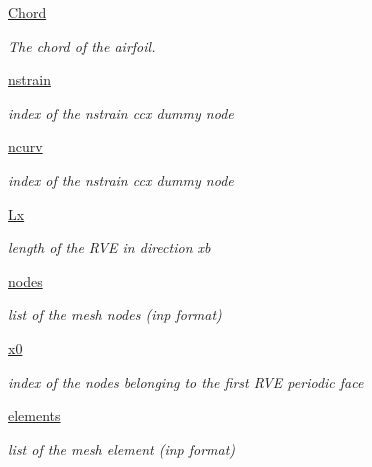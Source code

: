 \begin{DoxyCompactItemize}
\hyperlink{classgebtaero_1_1_external_mesh_1_1_external_mesh_ac9f8fc4f8dd8e81757bc8a5b2b5323d4}{Chord}
\begin{DoxyCompactList}\small\item\em The chord of the airfoil. \end{DoxyCompactList}\item 
\hyperlink{classgebtaero_1_1_external_mesh_1_1_external_mesh_ac8524a9940fbf969271113875fd4da1a}{nstrain}
\begin{DoxyCompactList}\small\item\em index of the nstrain ccx dummy node \end{DoxyCompactList}\item 
\hyperlink{classgebtaero_1_1_external_mesh_1_1_external_mesh_ac11f9e6adddf7c9e5ae563d694d4b1b9}{ncurv}
\begin{DoxyCompactList}\small\item\em index of the nstrain ccx dummy node \end{DoxyCompactList}\item 
\hyperlink{classgebtaero_1_1_external_mesh_1_1_external_mesh_a7804df618265ca2d1e76ba4697139f9d}{Lx}
\begin{DoxyCompactList}\small\item\em length of the R\+VE in direction xb \end{DoxyCompactList}\item 
\hyperlink{classgebtaero_1_1_external_mesh_1_1_external_mesh_abb7c716a5f2adf2a1f878b1034dcdc57}{nodes}
\begin{DoxyCompactList}\small\item\em list of the mesh nodes (inp format) \end{DoxyCompactList}\item 
\hyperlink{classgebtaero_1_1_external_mesh_1_1_external_mesh_acaa3b125cb4f80848007b82426c14ffa}{x0}
\begin{DoxyCompactList}\small\item\em index of the nodes belonging to the first R\+VE periodic face \end{DoxyCompactList}\item 
\hyperlink{classgebtaero_1_1_external_mesh_1_1_external_mesh_a1a044fbcf39f5f8e7d3e3b98d291010d}{elements}
\begin{DoxyCompactList}\small\item\em list of the mesh element (inp format) \end{DoxyCompactList}\end{DoxyCompactItemize}



